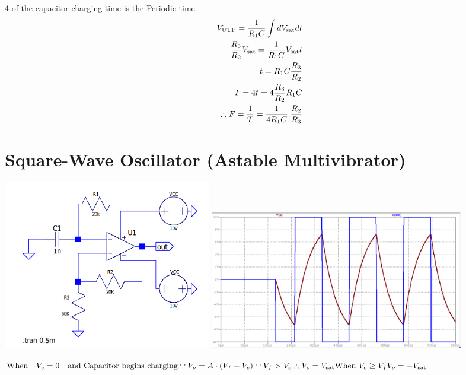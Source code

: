 \documentclass[a4paper, 12pt]{report}
\begin{document}
\begin{center}
\begin{center}
\begin{center}
\begin{center}
\begin{center}
\begin{center}
\begin{center}
\begin{center}
\begin{center}
\begin{center}
\begin{center}
\begin{center}
4 of the capacitor charging time is the Periodic time.\\
\begin{equation}\notag
    \begin{align}
        V_\text{UTP} = \frac{1}{R_1C} \int dV_\text{sat}dt\\
        \frac{R_3}{R_2}V_\text{sat} = \frac{1}{R_1C} V_\text{sat}t\\
        t = R_1C\frac{R_3}{R_2}\\
        T = 4t = 4\frac{R_3}{R_2}R_1C\\
        \therefore F=\frac{1}{T} = \frac{1}{4R_1C}.\frac{R_2}{R_3}
    \end{align}
\end{equation}
\section{Square-Wave Oscillator (Astable Multivibrator)}
\begin{center}
\includegraphics[width=0.4\textwidth]{figures/25c.png}\quad\quad
\includegraphics[width=0.49\textwidth]{figures/25w.png}\\
\end{center}
\noindent 
\begin{math}
    \text{When} \quad V_c = 0 \quad \text{and\ Capacitor\ begins\ charging}\\
    \because V_o = A\cdot(V_f - V_c) \\
    \because V_f > V_c\\
    \therefore V_o = V_\text{sat} \\
    \text{When\ } V_c \ge V_f \\
    V_o = - V_\text{sat}\\

\end{math}
\end{center}
\end{center}
\end{center}
\end{center}
\end{center}
\end{center}
\end{center}
\end{center}
\end{center}
\end{center}
\end{center}
\end{center}
\end{document}
